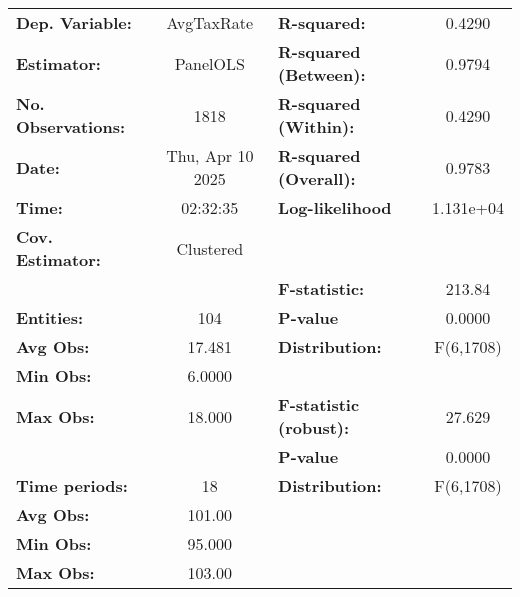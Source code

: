 \begin{center}
\begin{tabular}{lclc}
\toprule
\textbf{Dep. Variable:}              &     AvgTaxRate     & \textbf{  R-squared:         }   &      0.4290      \\
\textbf{Estimator:}                  &      PanelOLS      & \textbf{  R-squared (Between):}  &      0.9794      \\
\textbf{No. Observations:}           &        1818        & \textbf{  R-squared (Within):}   &      0.4290      \\
\textbf{Date:}                       &  Thu, Apr 10 2025  & \textbf{  R-squared (Overall):}  &      0.9783      \\
\textbf{Time:}                       &      02:32:35      & \textbf{  Log-likelihood     }   &    1.131e+04     \\
\textbf{Cov. Estimator:}             &     Clustered      & \textbf{                     }   &                  \\
\textbf{}                            &                    & \textbf{  F-statistic:       }   &      213.84      \\
\textbf{Entities:}                   &        104         & \textbf{  P-value            }   &      0.0000      \\
\textbf{Avg Obs:}                    &       17.481       & \textbf{  Distribution:      }   &    F(6,1708)     \\
\textbf{Min Obs:}                    &       6.0000       & \textbf{                     }   &                  \\
\textbf{Max Obs:}                    &       18.000       & \textbf{  F-statistic (robust):} &      27.629      \\
\textbf{}                            &                    & \textbf{  P-value            }   &      0.0000      \\
\textbf{Time periods:}               &         18         & \textbf{  Distribution:      }   &    F(6,1708)     \\
\textbf{Avg Obs:}                    &       101.00       & \textbf{                     }   &                  \\
\textbf{Min Obs:}                    &       95.000       & \textbf{                     }   &                  \\
\textbf{Max Obs:}                    &       103.00       & \textbf{                     }   &                  \\

\end{tabular}
\end{center}
